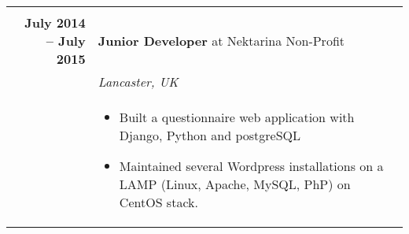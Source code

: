 \documentclass[a4paper,10pt]{article} %
\begin{document}
\begin{tabularx}{\textwidth}{r|X}
\multicolumn{2}{r}{} \\ %

\textbf{July 2014 -- July 2015}     & \textbf{Junior Developer} at {Nektarina Non-Profit}\\
                                    & \emph{Lancaster, UK}\\
                                    & \footnotesize
    {\begin{itemize}
    \item Built a questionnaire web application with Django, Python and postgreSQL
    \item Maintained several Wordpress installations on a LAMP (Linux, Apache,
    MySQL, PhP) on CentOS stack.
    \end{itemize}}\\

\end{tabularx}

\end{document}
